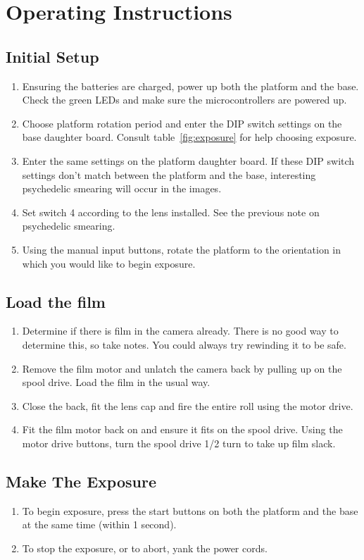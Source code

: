 \documentclass[dvips,12pt]{article}
\begin{document}
\section{Operating Instructions}

\subsection{Initial Setup}
\begin{enumerate}
\item Ensuring the batteries are charged, power up both the platform and the base. Check the green LEDs and make sure the microcontrollers are powered up.
\item Choose platform rotation period and enter the DIP switch settings on the base daughter board. Consult table~\ref{fig:exposure} for help choosing exposure.
\item Enter the same settings on the platform daughter board. If these DIP switch settings don't match between the platform and the base, interesting psychedelic smearing will occur in the images.
\item Set switch 4 according to the lens installed. See the previous note on psychedelic smearing. 
\item Using the manual input buttons, rotate the platform to the orientation in which you would like to begin exposure. 
\end{enumerate}

\subsection{Load the film}
\begin{enumerate}
\item Determine if there is film in the camera already. There is no good way to determine this, so take notes. You could always try rewinding it to be safe.
\item Remove the film motor and unlatch the camera back by pulling up on the spool drive.
Load the film in the usual way.
\item Close the back, fit the lens cap and fire the entire roll using the motor drive.
\item Fit the film motor back on and ensure it fits on the spool drive. Using the motor drive buttons, turn the spool drive 1/2 turn to take up film slack.
\end{enumerate}

\subsection{Make The Exposure}
\begin{enumerate}
\item To begin exposure, press the start buttons on both the platform and the base at the same time (within 1 second).
\item To stop the exposure, or to abort, yank the power cords.
\end{enumerate}
\end{document}
